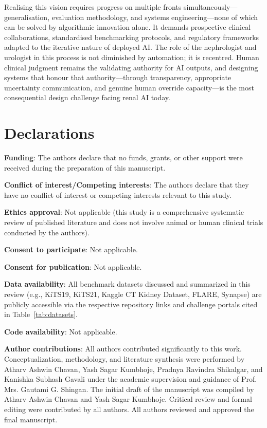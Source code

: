 \documentclass[pdflatex,sn-mathphys-num]{sn-jnl}%
\begin{document}
Realising this vision requires progress on multiple fronts simultaneously---generalisation, evaluation methodology, and systems engineering---none of which can be solved by algorithmic innovation alone. It demands prospective clinical collaborations, standardised benchmarking protocols, and regulatory frameworks adapted to the iterative nature of deployed AI. The role of the nephrologist and urologist in this process is not diminished by automation; it is recentred. Human clinical judgment remains the validating authority for AI outputs, and designing systems that honour that authority---through transparency, appropriate uncertainty communication, and genuine human override capacity---is the most consequential design challenge facing renal AI today.

\section*{Declarations}

\textbf{Funding}: The authors declare that no funds, grants, or other support were received during the preparation of this manuscript.

\textbf{Conflict of interest/Competing interests}: The authors declare that they have no conflict of interest or competing interests relevant to this study.

\textbf{Ethics approval}: Not applicable (this study is a comprehensive systematic review of published literature and does not involve animal or human clinical trials conducted by the authors).

\textbf{Consent to participate}: Not applicable.

\textbf{Consent for publication}: Not applicable.

\textbf{Data availability}: All benchmark datasets discussed and summarized in this review (e.g., KiTS19, KiTS21, Kaggle CT Kidney Dataset, FLARE, Synapse) are publicly accessible via the respective repository links and challenge portals cited in Table~\ref{tab:datasets}.

\textbf{Code availability}: Not applicable.

\textbf{Author contributions}: All authors contributed significantly to this work. Conceptualization, methodology, and literature synthesis were performed by Atharv Ashwin Chavan, Yash Sagar Kumbhoje, Pradnya Ravindra Shikalgar, and Kanishka Subhash Gavali under the academic supervision and guidance of Prof. Mrs. Gautami G. Shingan. The initial draft of the manuscript was compiled by Atharv Ashwin Chavan and Yash Sagar Kumbhoje. Critical review and formal editing were contributed by all authors. All authors reviewed and approved the final manuscript.



\end{document}
